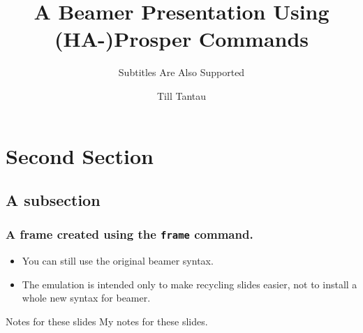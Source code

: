 \documentclass[notes]{beamer}
\title{A Beamer Presentation Using (HA-)Prosper Commands}
\subtitle{Subtitles Are Also Supported}
\author{Till Tantau}
\begin{document}
\maketitle




\section{Second Section}

\subsection{A subsection}

\frame
{
  \frametitle{A frame created using the \texttt{frame} command.}

  \begin{itemize}[<+->]
  \item You can still use the original beamer syntax.
  \item The emulation is intended only to make recycling slides
    easier, not to install a whole new syntax for beamer.
  \end{itemize}
}

\begin{notes}{Notes for these slides}
My notes for these slides.
\end{notes}
\end{document}
